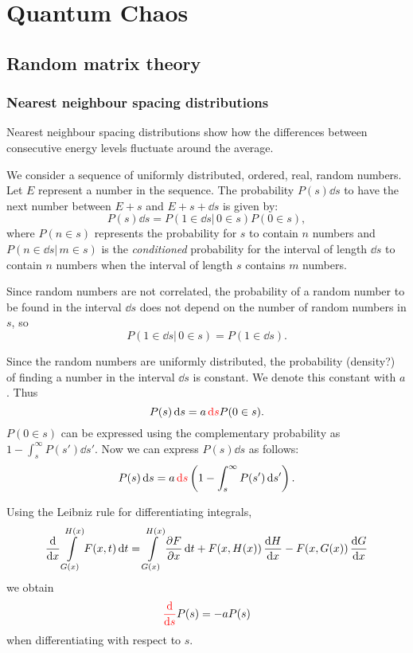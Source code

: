 \documentclass[../thesis.tex]{subfiles}
\begin{document}
\chapter{Quantum Chaos}

\section{Random matrix theory}

  \subsection{Nearest neighbour spacing distributions}

  Nearest neighbour spacing distributions show how the differences
  between consecutive energy levels fluctuate around the average.

  We consider a sequence of uniformly distributed, ordered, real, random numbers.
  Let $E$ represent a number in the sequence.
  The probability \( P(s)\dd{s} \) to have the next number between \( E+s \) and
  \( E+s+\dd{s} \) is given by:
  \[
    P(s)\dd{s} = P(1 \in \dd{s} |\, 0 \in s) P(0 \in s),
  \]
  where \( P(n \in s) \) represents the probability for $s$ to contain $n$ numbers and
  \( P(n \in \dd{s} |\, m \in s) \) is the \emph{conditioned} probability for
  the interval of length \( \dd{s} \) to contain $n$ numbers when the interval of
  length $s$ contains $m$ numbers.

  Since random numbers are not correlated, the probability of a random number to be found
  in the interval \( \dd{s} \) does not depend on the number of random numbers in $s$, so
  \[
    P(1 \in \dd{s} |\, 0 \in s) = P(1 \in \dd{s}).
  \]

  Since the random numbers are uniformly distributed, the probability {\color{red} (density?)} of finding a number
  in the interval \( \dd{s} \) is constant. We denote this constant with $a$. Thus
  \[
    P(s)\dd{s} = a \,{\color{red}\dd{s}} P(0 \in s).
  \]
  \( P(0 \in s) \) can be expressed using the complementary probability as
  \( {1 - \int_s^\infty P(s') \dd{s'}} \). Now we can express \( P(s)\dd{s} \) as follows:
  \[
    P(s)\dd{s} = a \,{\color{red}\dd{s}} \left( 1 - \int_s^\infty P(s') \dd{s'} \right).
  \]

  Using the Leibniz rule for differentiating integrals,
  \[
    \dv{x} \int\limits_{G(x)}^{H(x)} F(x, t) \dd{t} = \int\limits_{G(x)}^{H(x)} \pdv{F}{x} \dd{t}
    + F(x, H(x))\, \dv{H}{x} - F(x, G(x))\, \dv{G}{x}
  \]
  we obtain
  \[
    {\color{red}\dv{s}}P(s) = -aP(s)
  \]
  when differentiating with respect to $s$.
\end{document}
